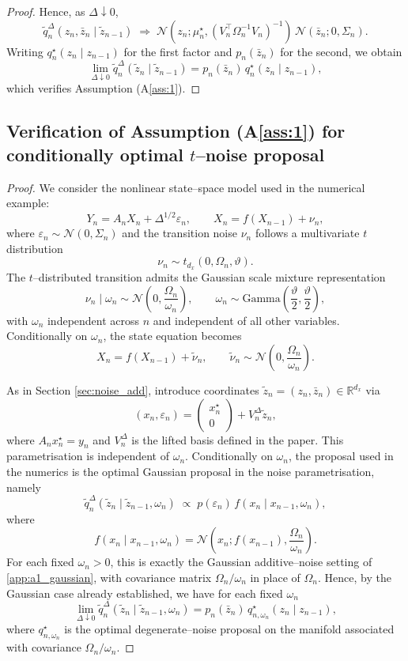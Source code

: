 \documentclass[english,13pt]{article}
\numberwithin{equation}{section}
\begin{document}
\begin{proof}
Hence, as $\Delta \downarrow 0$,
\[
\tilde q_n^\Delta(z_n,\bar z_n \mid \tilde z_{n-1})
\;\Rightarrow\;
\mathcal N(z_n;\mu_n^\star,(V_n^\top\Omega_n^{-1}V_n)^{-1})\,
\mathcal N(\bar z_n;0,\Sigma_n).
\]
Writing $q_n^\star(z_n\mid z_{n-1})$ for the first factor and
$p_n(\bar z_n)$ for the second, we obtain
\[
\lim_{\Delta\downarrow 0}
\tilde q_n^\Delta(\tilde z_n \mid \tilde z_{n-1})
=
p_n(\bar z_n)\, q_n^\star(z_n\mid z_{n-1}),
\]
which verifies Assumption (A\ref{ass:1}).
\end{proof}


\subsection{Verification of Assumption (A\ref{ass:1}) for conditionally optimal $t$--noise proposal}\label{app:a1_tdist}
\begin{proof}

We consider the nonlinear state--space model used in the numerical example:
\[
Y_n = A_n X_n + \Delta^{1/2}\varepsilon_n,
\qquad
X_n = f(X_{n-1}) + \nu_n,
\]
where $\varepsilon_n \sim \mathcal N(0,\Sigma_n)$ and the transition noise
$\nu_n$ follows a multivariate $t$ distribution
\[
\nu_n \sim t_{d_x}(0,\Omega_n,\vartheta).
\]
The $t$--distributed transition admits the Gaussian scale mixture representation
\[
\nu_n \mid \omega_n \sim \mathcal N\!\left(0,\frac{\Omega_n}{\omega_n}\right),
\qquad
\omega_n \sim \mathrm{Gamma}\!\left(\frac{\vartheta}{2},\frac{\vartheta}{2}\right),
\]
with $\omega_n$ independent across $n$ and independent of all other variables.
Conditionally on $\omega_n$, the state equation becomes
\[
X_n = f(X_{n-1}) + \tilde\nu_n,
\qquad
\tilde\nu_n \sim \mathcal N\!\left(0,\frac{\Omega_n}{\omega_n}\right).
\]

As in Section \eqref{sec:noise_add}, introduce coordinates $\tilde z_n=(z_n,\bar z_n)\in\mathbb R^{d_x}$
via
\[
(x_n,\varepsilon_n)
=
\begin{pmatrix}
x_n^\star \\ 0
\end{pmatrix}
+
V_n^\Delta \tilde z_n,
\]
where $A_n x_n^\star=y_n$ and $V_n^\Delta$ is the lifted basis defined in the paper.
This parametrisation is independent of $\omega_n$.
Conditionally on $\omega_n$, the proposal used in the numerics is the optimal
Gaussian proposal in the noise parametrisation, namely
\[
\tilde q_n^\Delta(\tilde z_n \mid \tilde z_{n-1},\omega_n)
\;\propto\;
p(\varepsilon_n)\,
f(x_n\mid x_{n-1},\omega_n),
\]
where
\[
f(x_n\mid x_{n-1},\omega_n)
=
\mathcal N\!\left(
x_n; f(x_{n-1}),\frac{\Omega_n}{\omega_n}
\right).
\]
For each fixed $\omega_n>0$, this is exactly the Gaussian additive--noise setting
of \eqref{app:a1_gaussian}, with covariance matrix $\Omega_n/\omega_n$ in place of $\Omega_n$.
Hence, by the Gaussian case already established, we have for each fixed $\omega_n$
\[
\lim_{\Delta\downarrow 0}
\tilde q_n^\Delta(\tilde z_n \mid \tilde z_{n-1},\omega_n)
=
p_n(\bar z_n)\,
q_{n,\omega_n}^\star(z_n\mid z_{n-1}),
\]
where $q_{n,\omega_n}^\star$ is the optimal degenerate--noise proposal on the manifold
associated with covariance $\Omega_n/\omega_n$.


\end{proof}
\end{document}
